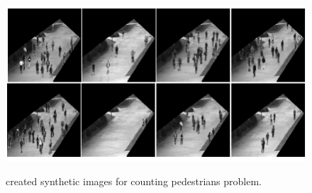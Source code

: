\begin{enumerate}
\begin{figure}[H]
	\centering
	{\includegraphics[width=1\textwidth]{images/myped}}
	\caption{created synthetic images for counting pedestrians problem.}
	\label{fig:myped}
\end{figure}

\end{enumerate}

